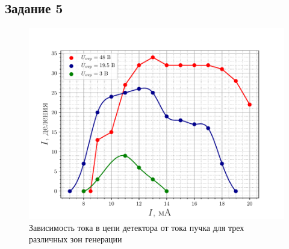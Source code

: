 
\subsection{Задание 5}
\begin{figure}[H]
		\centering
		\includegraphics[height=0.4\textheight]{fig/task5}
		\caption{Зависимость тока в цепи детектора от тока пучка для трех различных зон генерации}
		\label{fig:task5}
\end{figure}

